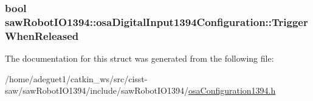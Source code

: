 \hypertarget{structsaw_robot_i_o1394_1_1osa_digital_input1394_configuration_a8422056c0ee6a2e53ecced0d79efe1b8}{
\subsubsection[{Trigger\-When\-Released}]{\setlength{\rightskip}{0pt plus 5cm}bool saw\-Robot\-I\-O1394\-::osa\-Digital\-Input1394\-Configuration\-::\-Trigger\-When\-Released}}\label{structsaw_robot_i_o1394_1_1osa_digital_input1394_configuration_a8422056c0ee6a2e53ecced0d79efe1b8}


The documentation for this struct was generated from the following file\-:\begin{DoxyCompactItemize}
\item 
/home/adeguet1/catkin\-\_\-ws/src/cisst-\/saw/saw\-Robot\-I\-O1394/include/saw\-Robot\-I\-O1394/\hyperlink{osa_configuration1394_8h}{osa\-Configuration1394.\-h}\end{DoxyCompactItemize}
